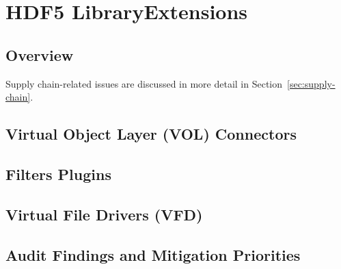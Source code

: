 \documentclass[../main.tex]{subfiles}
\begin{document}
\section{HDF5 LibraryExtensions}
\label{sec:extensions}

\subsection{Overview}

Supply chain-related issues are discussed in more detail in Section~\ref{sec:supply-chain}.

\subsection{Virtual Object Layer (VOL) Connectors}

\subsection{Filters Plugins}

\subsection{Virtual File Drivers (VFD)}

\subsection{Audit Findings and Mitigation Priorities}
\end{document}
